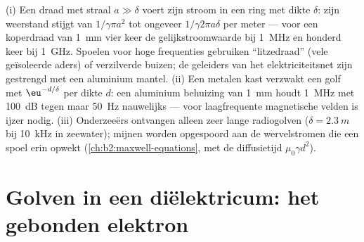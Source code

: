 \begin{example}\label{ex:b2:waves-in-media:skinuses}
(i) Een draad met straal $a \gg \delta$ voert zijn stroom in een ring met
dikte $\delta$: zijn weerstand stijgt van $1/\gamma\pi a^2$ tot ongeveer
$1/\gamma
2\pi a\delta$ per meter --- voor een koperdraad van \qty{1}{mm}
vier keer de gelijkstroomwaarde bij \qty{1}{MHz} en honderd keer bij
\qty{1}{GHz}. Spoelen voor hoge frequenties gebruiken ``litzedraad'' (vele
geïsoleerde aders) of verzilverde buizen; de geleiders van het
elektriciteitsnet zijn gestrengd met een aluminium mantel. (ii) Een metalen
kast verzwakt een golf met $\eu^{-d/\delta}$ per dikte $d$: een aluminium
behuizing van \qty{1}{mm} houdt \qty{1}{MHz} met \qty{100}{dB} tegen maar
\qty{50}{Hz} nauwelijks --- voor laagfrequente magnetische velden is ijzer
nodig. (iii) Onderzeeërs ontvangen alleen zeer lange radiogolven
($\delta = \qty{2.3}{m}$ bij \qty{10}{kHz} in zeewater); mijnen worden
opgespoord aan de wervelstromen die een spoel erin opwekt
(\cref{ch:b2:maxwell-equations}, met de diffusietijd $\mu_0\gamma d^2$).
\end{example}

\section{Golven in een diëlektricum: het gebonden elektron}

